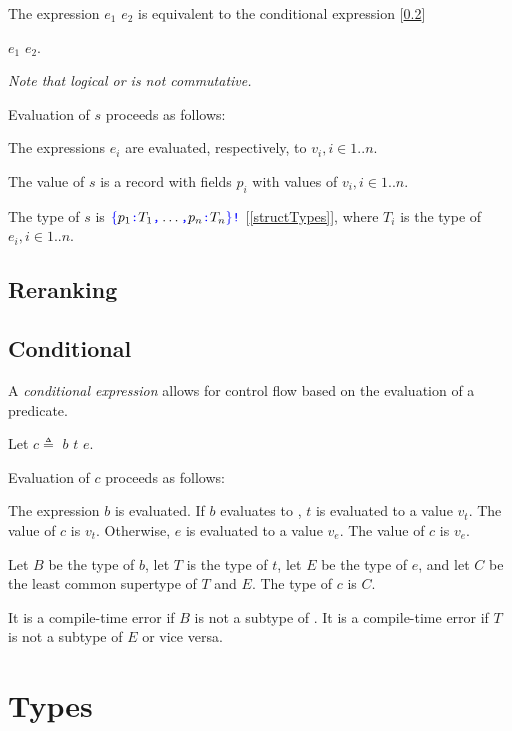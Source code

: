 \documentclass{article}
\begin{document}
{\OrExpression{}

The expression $e_1$ \OR{} $e_2$ is equivalent to the conditional expression [\ref{conditional}] 

\IF{} $e_1$ \THEN{} \TRUE{} \ELSE{} $e_2$.

{\em
Note that logical or is not commutative.
}


Evaluation of $s$ proceeds as follows:

The expressions $e_i$ are evaluated, respectively, to $v_i, i \in 1..n$. 

The value of $s$ is a record with fields $p_i$ with values of $v_i, i \in 1..n$. 

The type of $s$ is $\texttt{\color{blue} $\{$}{}p_1\texttt{\color{blue} :}{} T_1\texttt{\color{blue} ,}{} \ldots\texttt{\color{blue} ,}{} p_n\texttt{\color{blue} :}{} T_n\texttt{\color{blue} $\}$}\texttt{\color{blue} !}$ [\ref{structTypes}], where $T_i$ is the type of $e_i, i \in 1..n$.


\subsection{Reranking}
\label{reranking}


\subsection{Conditional}
\label{conditional}

A {\em conditional expression} allows for control flow based on the evaluation of a predicate.

\ConditionalExpression{}

Let $c \triangleq $ \IF{} $b$ \THEN{} $t$ \ELSE{} $e$.

Evaluation of $c$ proceeds as follows:

The expression $b$ is evaluated. 
If $b$ evaluates to \TRUE{}, $t$ is evaluated to a value $v_t$. The value of $c$ is $v_t$. Otherwise, $e$ is evaluated to a value $v_e$. The value of $c$ is $v_e$.

Let $B$ be the type of $b$, let $T$ is the type of $t$, let $E$ be the type of $e$, and let $C$ be the least common supertype of $T$ and $E$. The type of $c$ is $C$. 

It is a compile-time error if $B$ is not a subtype of \BOOL{}. It is a compile-time error if $T$ is not a subtype of $E$ or vice versa. 


\section{Types}
\label{types}

}
\end{document}
